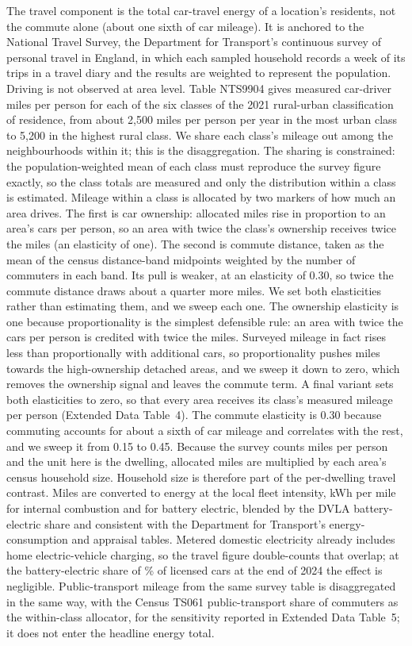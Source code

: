 \documentclass[pdflatex,sn-nature]{sn-jnl}
\begin{document}
The travel component is the total car-travel energy of a location's residents, not the commute alone (about one sixth of car mileage). It is anchored to the National Travel Survey, the Department for Transport's continuous survey of personal travel in England, in which each sampled household records a week of its trips in a travel diary and the results are weighted to represent the population. Driving is not observed at area level. Table NTS9904 gives measured car-driver miles per person for each of the six classes of the 2021 rural-urban classification of residence, from about 2,500 miles per person per year in the most urban class to 5,200 in the highest rural class. We share each class's mileage out among the neighbourhoods within it; this is the disaggregation. The sharing is constrained: the population-weighted mean of each class must reproduce the survey figure exactly, so the class totals are measured and only the distribution within a class is estimated. Mileage within a class is allocated by two markers of how much an area drives. The first is car ownership: allocated miles rise in proportion to an area's cars per person, so an area with twice the class's ownership receives twice the miles (an elasticity of one). The second is commute distance, taken as the mean of the census distance-band midpoints weighted by the number of commuters in each band. Its pull is weaker, at an elasticity of 0.30, so twice the commute distance draws about a quarter more miles. We set both elasticities rather than estimating them, and we sweep each one. The ownership elasticity is one because proportionality is the simplest defensible rule: an area with twice the cars per person is credited with twice the miles. Surveyed mileage in fact rises less than proportionally with additional cars, so proportionality pushes miles towards the high-ownership detached areas, and we sweep it down to zero, which removes the ownership signal and leaves the commute term. A final variant sets both elasticities to zero, so that every area receives its class's measured mileage per person (Extended Data Table~4). The commute elasticity is 0.30 because commuting accounts for about a sixth of car mileage and correlates with the rest, and we sweep it from 0.15 to 0.45. Because the survey counts miles per person and the unit here is the dwelling, allocated miles are multiplied by each area's census household size. Household size is therefore part of the per-dwelling travel contrast. Miles are converted to energy at the local fleet intensity, \nepitravelIce{} kWh per mile for internal combustion and \nepitravelEv{} for battery electric, blended by the DVLA battery-electric share and consistent with the Department for Transport's energy-consumption and appraisal tables. Metered domestic electricity already includes home electric-vehicle charging, so the travel figure double-counts that overlap; at the battery-electric share of \nepibevSharePct\% of licensed cars at the end of 2024 the effect is negligible. Public-transport mileage from the same survey table is disaggregated in the same way, with the Census TS061 public-transport share of commuters as the within-class allocator, for the sensitivity reported in Extended Data Table~5; it does not enter the headline energy total.
\end{document}

